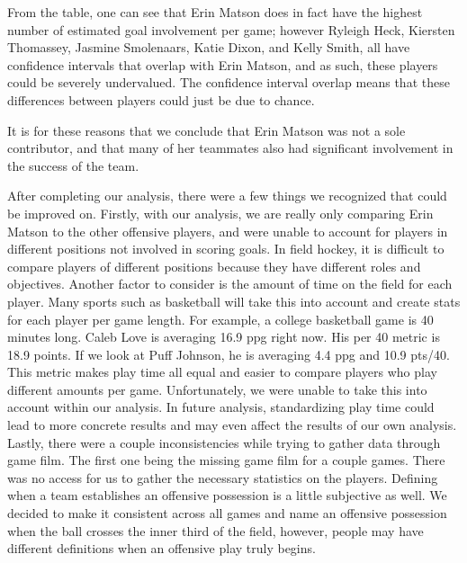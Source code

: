 \documentclass{article} %
\begin{document}
From the table, one can see that Erin Matson does in fact have the highest number of estimated goal involvement per game; however Ryleigh Heck, Kiersten Thomassey, Jasmine Smolenaars, Katie Dixon, and Kelly Smith, all have confidence intervals that overlap with Erin Matson, and as such, these players could be severely undervalued. The confidence interval overlap means that these differences between players could just be due to chance.

It is for these reasons that we conclude that Erin Matson was not a sole contributor, and that many of her teammates also had significant involvement in the success of the team. 

After completing our analysis, there were a few things we recognized that could be improved on. Firstly, with our analysis, we are really only comparing Erin Matson to the other offensive players, and were unable to account for players in different positions not involved in scoring goals. In field hockey, it is difficult to compare players of different positions because they have different roles and objectives. Another factor to consider is the amount of time on the field for each player. Many sports such as basketball will take this into account and create stats for each player per game length. For example, a college basketball game is 40 minutes long. Caleb Love is averaging 16.9 ppg right now. His per 40 metric is 18.9 points. If we look at Puff Johnson, he is averaging 4.4 ppg and 10.9 pts/40. This metric makes play time all equal and easier to compare players who play different amounts per game. Unfortunately, we were unable to take this into account within our analysis. In future analysis, standardizing play time could lead to more concrete results and may even affect the results of our own analysis. Lastly, there were a couple inconsistencies while trying to gather data through game film. The first one being the missing game film for a couple games. There was no access for us to gather the necessary statistics on the players. Defining when a team establishes an offensive possession is a little subjective as well. We decided to make it consistent across all games and name an offensive possession when the ball crosses the inner third of the field, however, people may have different definitions when an offensive play truly begins. 
\end{document}

